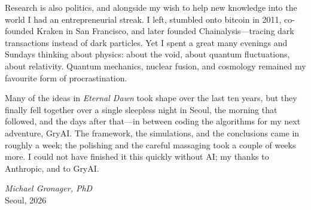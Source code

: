 Research is also politics, and alongside my wish to help new knowledge into the
world I had an entrepreneurial streak. I left, stumbled onto bitcoin in 2011,
co-founded Kraken in San Francisco, and later founded Chainalysis---tracing dark
transactions instead of dark particles. Yet I spent a great many evenings and
Sundays thinking about physics: about the void, about quantum fluctuations, about
relativity. Quantum mechanics, nuclear fusion, and cosmology remained my favourite
form of procrastination.

Many of the ideas in \emph{Eternal Dawn} took shape over the last ten years, but
they finally fell together over a single sleepless night in Seoul, the morning
that followed, and the days after that---in between coding the algorithms for my
next adventure, GryAI. The framework, the simulations, and the conclusions came in
roughly a week; the polishing and the careful massaging took a couple of weeks
more. I could not have finished it this quickly without AI; my thanks to
Anthropic, and to GryAI.

\bigskip
\begin{flushright}
\emph{Michael Gronager, PhD}\\[0.3ex]
{\small Seoul, 2026}
\end{flushright}
